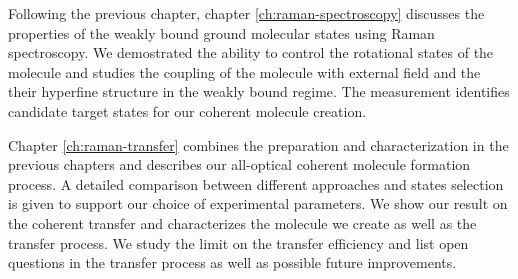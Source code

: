 Following the previous chapter, chapter \ref{ch:raman-spectroscopy} discusses
the properties of the weakly bound ground molecular states using Raman spectroscopy.
We demostrated the ability to control the rotational states of the molecule
and studies the coupling of the molecule with external field
and the their hyperfine structure in the weakly bound regime.
The measurement identifies candidate target states for our coherent molecule creation.

Chapter \ref{ch:raman-transfer} combines the preparation and characterization
in the previous chapters and describes our all-optical coherent molecule formation process.
A detailed comparison between different approaches and states selection is given
to support our choice of experimental parameters.
We show our result on the coherent transfer and characterizes
the molecule we create as well as the transfer process.
We study the limit on the transfer efficiency
and list open questions in the transfer process
as well as possible future improvements.
